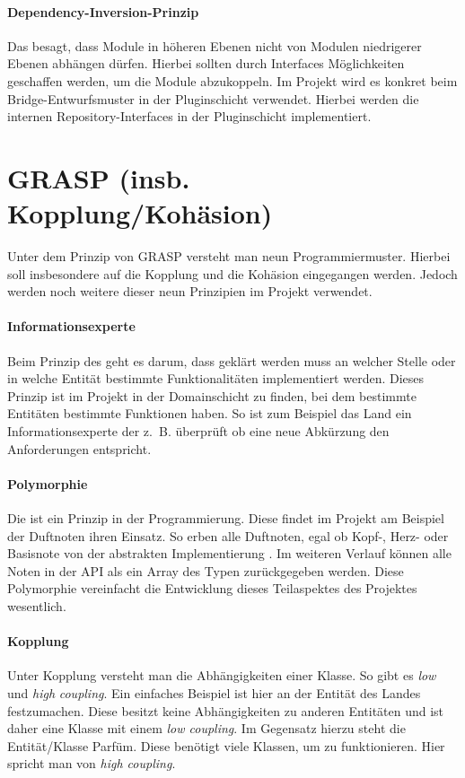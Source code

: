 		\paragraph{Dependency-Inversion-Prinzip}
		Das  besagt, dass Module in höheren Ebenen nicht von Modulen niedrigerer Ebenen abhängen dürfen. Hierbei sollten durch Interfaces Möglichkeiten geschaffen werden, um die Module abzukoppeln. Im Projekt wird es konkret beim Bridge-Entwurfsmuster in der Pluginschicht verwendet. Hierbei werden die internen Repository-Interfaces in der Pluginschicht implementiert.
	
	\section{GRASP (insb. Kopplung/Kohäsion)}
		Unter dem Prinzip von GRASP versteht man neun Programmiermuster. Hierbei soll insbesondere auf die Kopplung und die Kohäsion eingegangen werden. Jedoch werden noch weitere dieser neun Prinzipien im Projekt verwendet.
		
		\paragraph{Informationsexperte}
		Beim Prinzip des  geht es darum, dass geklärt werden muss an welcher Stelle oder in welche Entität bestimmte Funktionalitäten implementiert werden. Dieses Prinzip ist im Projekt in der Domainschicht zu finden, bei dem bestimmte Entitäten bestimmte Funktionen haben. So ist zum Beispiel das Land ein Informationsexperte der z. B. überprüft ob eine neue Abkürzung den Anforderungen entspricht.
		
		\paragraph{Polymorphie}
		Die  ist ein Prinzip in der Programmierung. Diese findet im Projekt am Beispiel der Duftnoten ihren Einsatz. So erben alle Duftnoten, egal ob Kopf-, Herz- oder Basisnote von der abstrakten Implementierung . Im weiteren Verlauf können alle Noten in der API als ein Array des Typen  zurückgegeben werden. Diese Polymorphie vereinfacht die Entwicklung dieses Teilaspektes des Projektes wesentlich.
		
		\paragraph{Kopplung}
		Unter Kopplung versteht man die Abhängigkeiten einer Klasse. So gibt es \textit{low} und \textit{high} \textit{coupling}. Ein einfaches Beispiel ist hier an der Entität des Landes festzumachen. Diese besitzt keine Abhängigkeiten zu anderen Entitäten und ist daher eine Klasse mit einem \textit{low coupling}. Im Gegensatz hierzu steht die Entität/Klasse Parfüm. Diese benötigt viele Klassen, um zu funktionieren. Hier spricht man von \textit{high coupling}.
		

